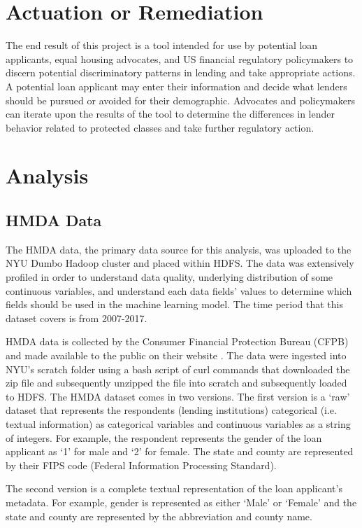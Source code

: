 \documentclass[conference,compsoc]{IEEEtran}
\begin{document}
\section{Actuation or Remediation}

 The end result of this project is a tool intended for use by potential loan applicants, equal housing advocates, and US financial regulatory policymakers to discern potential discriminatory patterns in lending and take appropriate actions. A potential loan applicant may enter their information and decide what lenders should be pursued or avoided for their demographic. Advocates and policymakers can iterate upon the results of the tool to determine the differences in lender behavior related to protected classes and take further regulatory action.

\section{Analysis}

\subsection{HMDA Data}

The HMDA data, the primary data source for this analysis, was uploaded to the NYU Dumbo Hadoop cluster and placed within HDFS.  The data was extensively profiled in order to understand data quality, underlying distribution of some continuous variables, and understand each data fields’ values to determine which fields should be used in the machine learning model.  The time period that this dataset covers is from 2007-2017. 

	HMDA data is collected by the Consumer Financial Protection Bureau (CFPB) and made available to the public on their website \cite{hmdalink}.  The data were ingested into NYU’s scratch folder using a bash script of curl commands that downloaded the zip file and subsequently unzipped the file into scratch and subsequently loaded to HDFS.  The HMDA dataset comes in two versions.  
The first version is a ‘raw’ dataset that represents the respondents (lending institutions) categorical (i.e. textual information) as categorical variables and continuous variables as a string of integers.  For example, the respondent represents the gender of the loan applicant as ‘1’ for male and ‘2’ for female.  The state and county are represented by their FIPS code (Federal Information Processing Standard).  

The second version is a complete textual representation of the loan applicant’s metadata.  For example, gender is represented as either ‘Male’ or ‘Female’ and the state and county are represented by the abbreviation and county name. 
\end{document}
